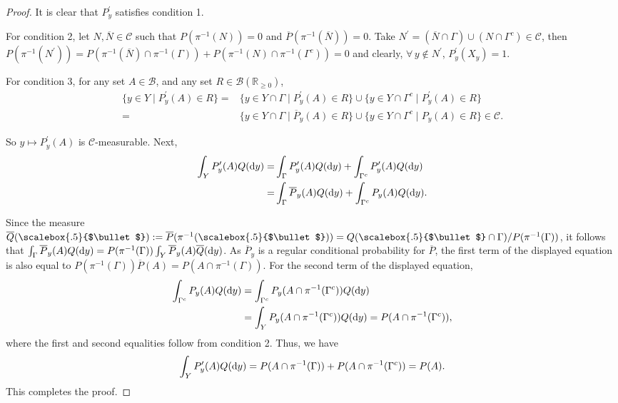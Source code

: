 \documentclass{amsart}
\renewcommand{\cdot}[1][.5]{%
  \mathbin{\vcenter{\hbox{\scalebox{#1}{$\bullet$}}}}%
}
\begin{document}
\begin{proof}
It is clear that $P_{y}^\prime$ satisfies condition 1. 

For condition 2, let $N,\overline{N}\in\mathcal{C}$ such that $P(\pi^{-1}(N))=0$
and $\overline{P}(\pi^{-1}(\overline{N}))=0$. Take $N^\prime=(\overline{N}\cap\Gamma)\cup(N\cap\Gamma^{c})\in\mathcal{C}$,
then $P(\pi^{-1}(N^\prime))= P(\pi^{-1}(\overline{N})\cap\pi^{-1}(\Gamma))+P(\pi^{-1}(N)\cap\pi^{-1}(\Gamma^{c}))=0$
and clearly, $\forall\,y\notin N^\prime$, $P_{y}^\prime(X_{y})=1$.

For condition 3, for any set $A\in\mathcal{B}$, and any set $R\in \mathcal{B}(\mathbb{R}_{\geq 0})$,
\begin{align*}
\{y\in Y \mid P_{y}^\prime(A)\in R\}= & \{y\in Y \cap \Gamma \mid P_{y}^\prime(A)\in R\}\cup \{y\in Y \cap \Gamma^c \mid P_{y}^\prime(A)\in R\}\\
= & \{y\in Y\cap\Gamma \mid \overline{P}_{y}(A)\in R\} \cup \{y\in Y\cap\Gamma^{c} \mid P_{y}(A)\in R\} \in\mathcal{C}.
\end{align*}

So $y\mapsto P_{y}^\prime(A)$ is $\mathcal{C}$-measurable. Next,
\begin{align*}
\int_{Y}P_{y}^\prime(A)Q({\rm d}y)= & \int_{\Gamma}P_{y}^\prime(A)Q({\rm d}y)+\int_{\Gamma^{c}}P_{y}^\prime(A)Q({\rm d}y)\\
= & \int_{\Gamma}\overline{P}_{y}(A)Q({\rm d}y)+\int_{\Gamma^{c}}P_{y}(A)Q({\rm d}y).
\end{align*}

Since the measure $\overline{Q}(\cdot) := \overline{P}(\pi^{-1}(\cdot))= Q(\cdot \cap \Gamma)/P(\pi^{-1}(\Gamma))$, it follows that
$\int_{\Gamma}\overline{P}_{y}(A)Q({\rm d}y)= P(\pi^{-1}(\Gamma))\int_{Y}\overline{P}_{y}(A)\overline{Q}({\rm d}y)$.  As $\overline{P}_{y}$ is a regular conditional probability for $\overline{P}$, the first term of the displayed equation is also equal to $P(\pi^{-1}(\Gamma))\overline{P}(A)=P(A\cap\pi^{-1}(\Gamma))$. For the second term of the displayed equation,
\begin{align*}
\int_{\Gamma^{c}}P_{y}(A)Q({\rm d}y)&=\int_{\Gamma^{c}}P_{y}(A\cap\pi^{-1}(\Gamma^{c}))Q({\rm d}y)\\
&=\int_{Y}P_{y}(A\cap\pi^{-1}(\Gamma^{c}))Q({\rm d}y)=P(A\cap\pi^{-1}(\Gamma^{c})),
\end{align*}
where the first and second equalities follow from condition 2.
Thus, we have
\[
\int_{Y}P_{y}^\prime(A)Q({\rm d}y)=P(A\cap\pi^{-1}(\Gamma))+P(A\cap\pi^{-1}(\Gamma^{c}))=P(A).
\]
This completes the proof.
\end{proof}
\end{document}
